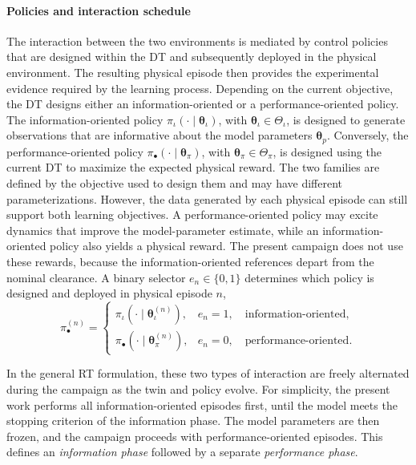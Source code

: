 \documentclass[journal]{IEEEtran}
\begin{document}
\paragraph*{Policies and interaction schedule}
The interaction between the two environments is mediated by control policies that are designed within the DT and subsequently deployed in the physical environment. The resulting physical episode then provides the experimental evidence required by the learning process. Depending on the current objective, the DT designs either an information-oriented or a performance-oriented policy. The information-oriented policy $\pi_{\iota}(\cdot\mid\boldsymbol{\theta}_{\iota})$, with $\boldsymbol{\theta}_{\iota}\in\Theta_{\iota}$, is designed to generate observations that are informative about the model parameters $\boldsymbol{\theta}_{p}$. Conversely, the performance-oriented policy $\pi_{\bullet}(\cdot\mid\boldsymbol{\theta}_{\pi})$, with $\boldsymbol{\theta}_{\pi}\in\Theta_{\pi}$, is designed using the current DT to maximize the expected physical reward. The two families are defined by the objective used to design them and may have different parameterizations. However, the data generated by each physical episode can still support both learning objectives. A performance-oriented policy may excite dynamics that improve the model-parameter estimate, while an information-oriented policy also yields a physical reward. The present campaign does not use these rewards, because the information-oriented references depart from the nominal clearance.
A binary selector $e_n\in\{0,1\}$ determines which policy is designed and deployed in physical episode $n$,
\begin{equation}
\pi_{\bullet}^{(n)}=
\begin{cases}
\pi_{\iota}\!\left(\cdot\mid\boldsymbol{\theta}_{\iota}^{(n)}\right),
& e_n=1,\quad \text{information-oriented},\\[2mm]
\pi_{\bullet}\!\left(\cdot\mid\boldsymbol{\theta}_{\pi}^{(n)}\right),
& e_n=0,\quad \text{performance-oriented}.
\end{cases}
\label{eq:rt-policy-schedule}\end{equation}

In the general RT formulation, these two types of interaction are freely alternated during the campaign as the twin and policy evolve. For simplicity, the present work performs all information-oriented episodes first, until the model meets the stopping criterion of the information phase. The model parameters are then frozen, and the campaign proceeds with performance-oriented episodes. This defines an \emph{information phase} followed by a separate \emph{performance phase}.
\end{document}
